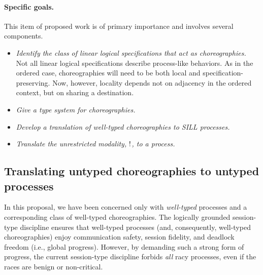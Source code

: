 \paragraph{Specific goals.}
This item of proposed work is of primary importance and involves several components.
\begin{itemize}
\item \emph{Identify the class of linear logical specifications that act as choreographies.}
  Not all linear logical specifications describe process-like behaviors.
  As in the ordered case, choreographies will need to be both local and specification-preserving.
  Now, however, locality depends not on adjacency in the ordered context, but on sharing a destination.
\item \emph{Give a type system for choreographies.}
\item \emph{Develop a translation of well-typed choreographies to \ac{SILL} processes.}
\item \emph{Translate the unrestricted modality, $\mathord{\text{!}}$, to a process.}
\end{itemize}


\subsection{Translating untyped choreographies to untyped processes}

In this proposal, we have been concerned only with \emph{well-typed} processes and a corresponding class of well-typed choreographies.
The logically grounded session-type discipline ensures that well-typed processes (and, consequently, well-typed choreographies) enjoy communication safety, session fidelity, and deadlock freedom (i.e., global progress).
However, by demanding such a strong form of progress, the current session-type discipline forbids \emph{all} racy processes, even if the races are benign or non-critical.



